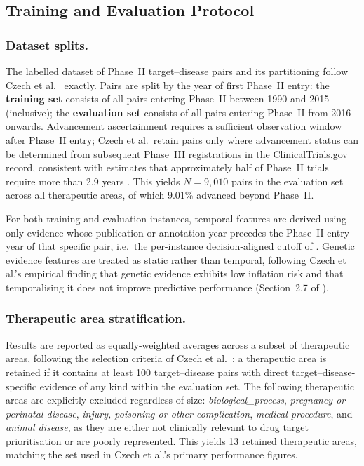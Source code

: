 \documentclass[a4,center]{NAR}
\begin{document}
{\subsection{Training and Evaluation Protocol}
\label{sec:training_evaluation}

\subsubsection{Dataset splits.}

The labelled dataset of Phase~II target--disease pairs and its
partitioning follow Czech et al.\ \citep{Czech2024CLINICALFORECASTING} exactly. Pairs are
split by the year of first Phase~II entry: the \textbf{training set}
consists of all pairs entering Phase~II between 1990 and 2015
(inclusive); the \textbf{evaluation set} consists of all pairs entering
Phase~II from 2016 onwards. Advancement ascertainment requires a
sufficient observation window after Phase~II entry; Czech et al.\ retain
pairs only where advancement status can be determined from subsequent
Phase~III registrations in the ClinicalTrials.gov record, consistent
with estimates that approximately half of Phase~II trials require more
than 2.9 years \citep{Wong2019}. This yields $N = 9{,}010$ pairs in the
evaluation set across all therapeutic areas, of which 9.01\% advanced
beyond Phase~II.

For both training and evaluation instances, temporal features are derived
using only evidence whose publication or annotation year precedes the
Phase~II entry year of that specific pair, i.e.\ the per-instance
decision-aligned cutoff of \citet{Czech2024CLINICALFORECASTING}. Genetic evidence features
are treated as static rather than temporal, following Czech et al.'s
empirical finding that genetic evidence exhibits low inflation risk and
that temporalising it does not improve predictive performance
(Section~2.7 of \citet{Czech2024CLINICALFORECASTING}).

\subsubsection{Therapeutic area stratification.}

Results are reported as equally-weighted averages across a subset of
therapeutic areas, following the selection criteria of Czech et al.\
\citep{Czech2024CLINICALFORECASTING}: a therapeutic area is retained if it contains at least
100 target--disease pairs with direct target--disease-specific evidence
of any kind within the evaluation set. The following therapeutic areas
are explicitly excluded regardless of size: \textit{biological\_process},
\textit{pregnancy or perinatal disease}, \textit{injury, poisoning or other
complication}, \textit{medical procedure}, and \textit{animal disease}, as
they are either not clinically relevant to drug target prioritisation or
are poorly represented. This yields 13 retained therapeutic areas, matching
the set used in Czech et al.'s primary performance figures.

}
\end{document}
